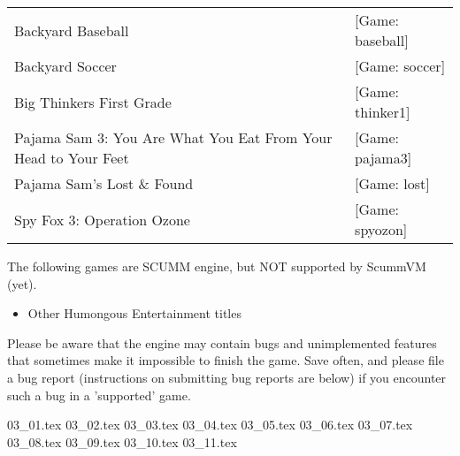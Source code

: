 \begin{itemize}
\begin{tabular}{ll}
  Backyard Baseball&                                             [Game: baseball]\\
  Backyard Soccer&                                               [Game: soccer]\\
  Big Thinkers First Grade&                                      [Game: thinker1]\\
  Pajama Sam 3: You Are What You Eat From Your Head to Your Feet&[Game: pajama3]\\
  Pajama Sam's Lost \& Found&                                    [Game: lost]\\
  Spy Fox 3: Operation Ozone&                                    [Game: spyozon]\\
\end{tabular}

  The following games are SCUMM engine, but NOT supported by ScummVM (yet).
  \begin{itemize}
  \item Other Humongous Entertainment titles
  \end{itemize}
%
Please be aware that the engine may contain bugs and unimplemented features
that sometimes make it impossible to finish the game. Save often, and please
file a bug report (instructions on submitting bug reports are below) if you
encounter such a bug in a 'supported' game.
\end{itemize}
 {03_01.tex}
 {03_02.tex}
 {03_03.tex}
 {03_04.tex}
 {03_05.tex}
 {03_06.tex}
 {03_07.tex}
 {03_08.tex}
 {03_09.tex}
 {03_10.tex}
 {03_11.tex}
